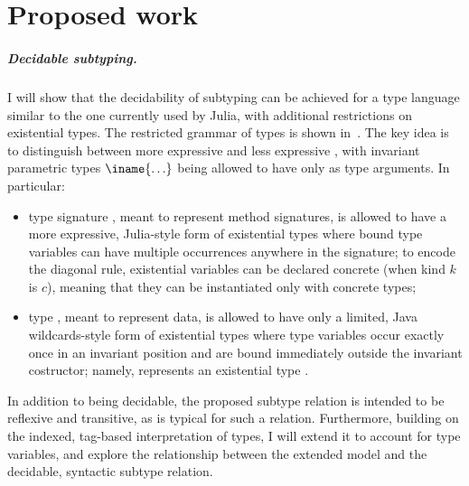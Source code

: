 \chapter{Proposed work}\label{chap:6}

\paragraph*{Decidable subtyping.}
I will show that
the decidability of subtyping can be achieved
for a type language similar to the one currently used by Julia,
with additional restrictions on existential types.
The restricted grammar of types is shown
in~.
The key idea is to distinguish between more expressive \tysig and
less expressive \ty, with invariant parametric types $\iname\{\ldots\}$
being allowed to have only \ty as type arguments. In particular:
\begin{itemize}
  \item type signature \tysig, meant to represent method signatures, is
  allowed to have a more expressive, Julia-style form of existential types where
  bound type variables can have multiple occurrences anywhere in the signature;
  to encode the diagonal rule, existential variables can be declared concrete
  (when kind $k$ is $c$), meaning that they can be instantiated only with
  concrete types;
  \item type \ty, meant to represent data, is allowed to have only a limited,
  Java wildcards-style form of existential types where type variables
  occur exactly once in an invariant position and are bound immediately outside
  the invariant costructor; namely,  represents
  an existential type .
\end{itemize}
In addition to being decidable, the proposed subtype relation
is intended to be reflexive and transitive,
as is typical for such a relation. Furthermore,
building on the indexed, tag-based interpretation of types, I will extend
it to account for type variables, and explore the relationship between
the extended model and the decidable, syntactic subtype relation.



